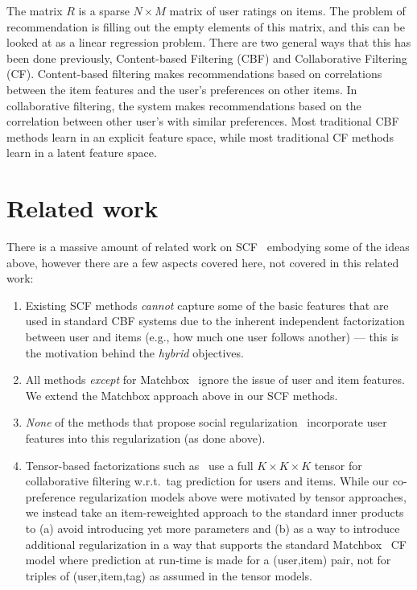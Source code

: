 The matrix $R$ is a sparse $N \times M$ matrix of user ratings on items. The problem of recommendation is filling out the empty elements of this matrix, and this can be looked at as a linear regression problem. There are two general ways that this has been done previously, Content-based Filtering (CBF) and Collaborative Filtering (CF). Content-based filtering makes recommendations based on correlations between the item features and the user's preferences on other items. In collaborative filtering, the system makes recommendations based on the correlation between other user's with similar preferences. Most traditional CBF methods learn in an explicit feature space, while most traditional CF methods learn in a latent feature space. 

\section{Related work}

There is a massive amount of related work on 
SCF~\cite{matchbox,ste,lla,glfm,tf,sorec,sr,rrmf,bisim,socinf} embodying some of the
ideas above, however there are a few aspects covered here, not covered
in this related work:
\begin{enumerate}
\item Existing SCF methods \emph{cannot} capture some of the basic features that are used in standard CBF systems due to the inherent independent factorization between user and items (e.g., how much one user follows another) --- this is the motivation behind the \emph{hybrid} objectives.
\item All methods \emph{except} for Matchbox~\cite{matchbox} ignore the issue of user and item features.  We extend the Matchbox approach above in our SCF methods. 
\item \emph{None} of the methods that propose social regularization~\cite{ste,sr,rrmf,lla,glfm,socinf} incorporate user features into this regularization (as done above).
\item Tensor-based factorizations such as~\cite{tf} use a full $K \times K \times K$ tensor for collaborative filtering w.r.t.\ tag prediction for users and items.  While our co-preference regularization models above were motivated by tensor approaches, we instead take an item-reweighted approach to the standard inner products to (a) avoid introducing yet more parameters and (b) as a way to introduce additional regularization in a way that supports the standard Matchbox~\cite{matchbox} CF model where prediction at run-time is made for a (user,item) pair, not for triples of (user,item,tag) as assumed in the tensor models.
\end{enumerate}

